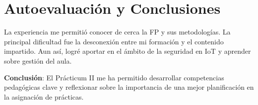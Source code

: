 \chapter{Autoevaluación y Conclusiones}
La experiencia me permitió conocer de cerca la FP y sus metodologías. La principal dificultad fue la desconexión entre mi formación y el contenido impartido. Aun así, logré aportar en el ámbito de la seguridad en IoT y aprender sobre gestión del aula.

\textbf{Conclusión}: El Prácticum II me ha permitido desarrollar competencias pedagógicas clave y reflexionar sobre la importancia de una mejor planificación en la asignación de prácticas.
